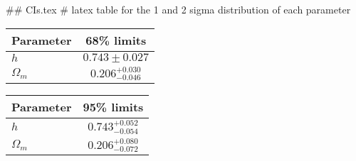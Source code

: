 ## CIs.tex
# latex table for the 1 and 2 sigma distribution of each parameter

\begin{tabular} { l  c}
 Parameter &  68\% limits\\
\hline
{\boldmath$h              $} & $0.743\pm 0.027            $\\
{\boldmath$\Omega_m       $} & $0.206^{+0.030}_{-0.046}   $\\
\hline
\end{tabular}

\begin{tabular} { l  c}
 Parameter &  95\% limits\\
\hline
{\boldmath$h              $} & $0.743^{+0.052}_{-0.054}   $\\
{\boldmath$\Omega_m       $} & $0.206^{+0.080}_{-0.072}   $\\
\hline
\end{tabular}
